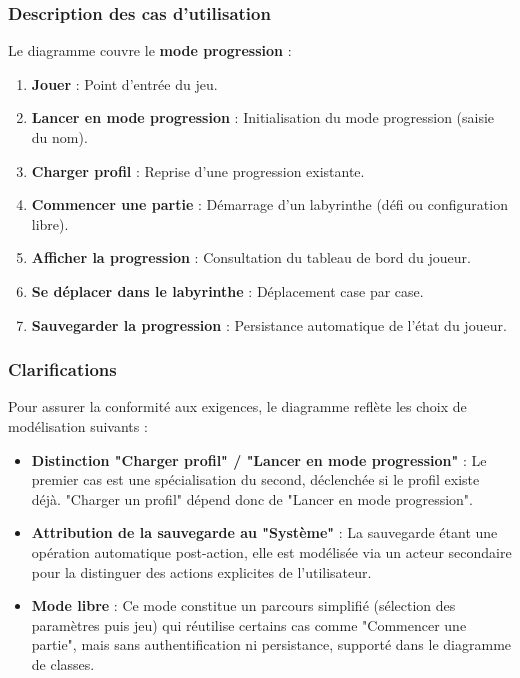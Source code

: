 \documentclass{butexFR}
\begin{document}
\subsubsection{Description des cas d'utilisation}

Le diagramme couvre le \textbf{mode progression} :

\begin{enumerate}
    \item \textbf{Jouer} : Point d'entrée du jeu.
    \item \textbf{Lancer en mode progression} : Initialisation du mode progression (saisie du nom).
    \item \textbf{Charger profil} : Reprise d'une progression existante.
    \item \textbf{Commencer une partie} : Démarrage d'un labyrinthe (défi ou configuration libre).
    \item \textbf{Afficher la progression} : Consultation du tableau de bord du joueur.
    \item \textbf{Se déplacer dans le labyrinthe} : Déplacement case par case.
    \item \textbf{Sauvegarder la progression} : Persistance automatique de l'état du joueur.
\end{enumerate}

\subsubsection{Clarifications}

Pour assurer la conformité aux exigences, le diagramme reflète les choix de modélisation suivants :

\begin{itemize}
    \item \textbf{Distinction "Charger profil" / "Lancer en mode progression"} : Le premier cas est une spécialisation du second, déclenchée si le profil existe déjà. "Charger un profil" dépend donc de "Lancer en mode progression".

    \item \textbf{Attribution de la sauvegarde au "Système"} : La sauvegarde étant une opération automatique post-action, elle est modélisée via un acteur secondaire pour la distinguer des actions explicites de l'utilisateur.

    \item \textbf{Mode libre} : Ce mode constitue un parcours simplifié (sélection des paramètres puis jeu) qui réutilise certains cas comme "Commencer une partie", mais sans authentification ni persistance, supporté dans le diagramme de classes.
\end{itemize}
\end{document}
